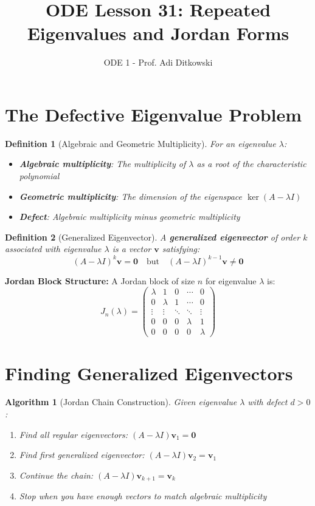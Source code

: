 \documentclass[12pt]{article}
\title{ODE Lesson 31: Repeated Eigenvalues and Jordan Forms}
\author{ODE 1 - Prof. Adi Ditkowski}
\date{}
\newtheorem{definition}{Definition}
\newtheorem{algorithm}{Algorithm}
\begin{document}
\maketitle

\section{The Defective Eigenvalue Problem}

\begin{definition}[Algebraic and Geometric Multiplicity]
For an eigenvalue $\lambda$:
\begin{itemize}
\item \textbf{Algebraic multiplicity}: The multiplicity of $\lambda$ as a root of the characteristic polynomial
\item \textbf{Geometric multiplicity}: The dimension of the eigenspace $\ker(A - \lambda I)$
\item \textbf{Defect}: Algebraic multiplicity minus geometric multiplicity
\end{itemize}
\end{definition}

\begin{definition}[Generalized Eigenvector]
A \textbf{generalized eigenvector} of order $k$ associated with eigenvalue $\lambda$ is a vector $\mathbf{v}$ satisfying:
\[(A - \lambda I)^{k} \mathbf{v} = \mathbf{0} \quad \text{but} \quad (A - \lambda I)^{k-1} \mathbf{v} \neq \mathbf{0}\]
\end{definition}

\begin{jordan}
\textbf{Jordan Block Structure:}
A Jordan block of size $n$ for eigenvalue $\lambda$ is:
\[J_{n}(\lambda) = \begin{pmatrix}
\lambda & 1 & 0 & \cdots & 0 \\
0 & \lambda & 1 & \cdots & 0 \\
\vdots & \vdots & \ddots & \ddots & \vdots \\
0 & 0 & 0 & \lambda & 1 \\
0 & 0 & 0 & 0 & \lambda
\end{pmatrix}\]
\end{jordan}

\section{Finding Generalized Eigenvectors}

\begin{algorithm}[Jordan Chain Construction]
Given eigenvalue $\lambda$ with defect $d > 0$:
\begin{enumerate}
\item Find all regular eigenvectors: $(A - \lambda I)\mathbf{v}_{1} = \mathbf{0}$
\item Find first generalized eigenvector: $(A - \lambda I)\mathbf{v}_{2} = \mathbf{v}_{1}$
\item Continue the chain: $(A - \lambda I)\mathbf{v}_{k+1} = \mathbf{v}_{k}$
\item Stop when you have enough vectors to match algebraic multiplicity
\end{enumerate}
\end{algorithm}
\end{document}
